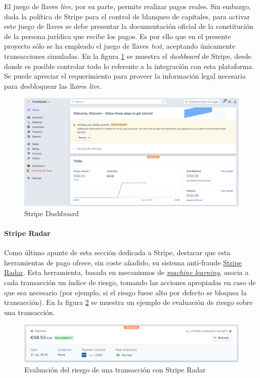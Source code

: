 \documentclass[a4paper,12pt,twoside,openright]{report}
\begin{document}
    El juego de llaves \emph{live}, por su parte, permite realizar pagos reales. Sin embargo, dada la política de Stripe para el control de blanqueo de capitales, para activar este juego de llaves se debe presentar la documentación oficial de la constitución de la persona jurídica que recibe los pagos. Es por ello que en el presente proyecto sólo se ha empleado el juego de llaves \emph{test}, aceptando únicamente transacciones simuladas. En la figura \ref{fig:stripe_dashboard} se muestra el \emph{dashboard} de Stripe, desde donde es posible controlar todo lo referente a la integración con esta plataforma. Se puede apreciar el requerimiento para proveer la información legal necesaria para desbloquear las llaves \emph{live}.
    
    \begin{figure}[hbt!]
    	\centering
    	\includegraphics[width=\textwidth,keepaspectratio]{stripe_dashboard}
    	\caption{Stripe Dashboard}
    	\label{fig:stripe_dashboard}
    \end{figure}
    
    \paragraph{Stripe Radar}
    Como último apunte de esta sección dedicada a Stripe, destacar que esta herramientas de pago ofrece, sin coste añadido, su sistema anti-fraude \href{https://stripe.com/es/radar}{Stripe Radar}. Esta herramienta, basada en mecanismos de \href{https://stripe.com/es/radar/guide}{\emph{machine learning}}, asocia a cada transacción un índice de riesgo, tomando las acciones apropiadas en caso de que sea necesario (por ejemplo, si el riesgo fuese alto por defecto se bloquea la transacción). En la figura \ref{fig:stripe_radar} se muestra un ejemplo de evaluación de riesgo sobre una transacción.
    
    \begin{figure}[hbt!]
    	\centering
    	\includegraphics[width=\textwidth,keepaspectratio]{stripe_radar}
    	\caption{Evaluación del riesgo de una transacción con Stripe Radar}
    	\label{fig:stripe_radar}
    \end{figure}
    
\end{document}
